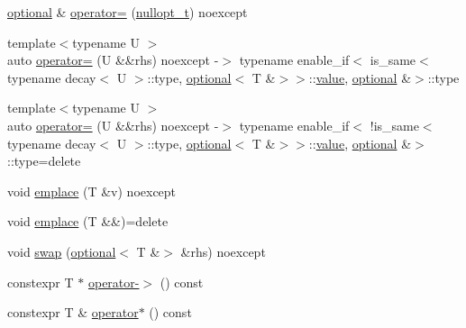 \begin{DoxyCompactItemize}
\item 
\mbox{\hyperlink{classstd_1_1experimental_1_1optional}{optional}} \& \mbox{\hyperlink{classstd_1_1experimental_1_1optional_3_01_t_01_6_01_4_af8f513f05e0710ae389c77721e02c4b8}{operator=}} (\mbox{\hyperlink{structstd_1_1experimental_1_1nullopt__t}{nullopt\+\_\+t}}) noexcept
\item 
{\footnotesize template$<$typename U $>$ }\\auto \mbox{\hyperlink{classstd_1_1experimental_1_1optional_3_01_t_01_6_01_4_a0ccf7e1456d6cdfa46a0a0a6de2f88ba}{operator=}} (U \&\&rhs) noexcept -\/$>$ typename enable\+\_\+if$<$ is\+\_\+same$<$ typename decay$<$ U $>$\+::type, \mbox{\hyperlink{classstd_1_1experimental_1_1optional}{optional}}$<$ T \&$>$$>$\+::\mbox{\hyperlink{classstd_1_1experimental_1_1optional_ad1277f09c288255dfe102b72e7107be6}{value}}, \mbox{\hyperlink{classstd_1_1experimental_1_1optional}{optional}} \&$>$\+::type
\item 
{\footnotesize template$<$typename U $>$ }\\auto \mbox{\hyperlink{classstd_1_1experimental_1_1optional_3_01_t_01_6_01_4_aa0784b03df926b6eb712d1af5d7a7c24}{operator=}} (U \&\&rhs) noexcept -\/$>$ typename enable\+\_\+if$<$ !is\+\_\+same$<$ typename decay$<$ U $>$\+::type, \mbox{\hyperlink{classstd_1_1experimental_1_1optional}{optional}}$<$ T \&$>$$>$\+::\mbox{\hyperlink{classstd_1_1experimental_1_1optional_ad1277f09c288255dfe102b72e7107be6}{value}}, \mbox{\hyperlink{classstd_1_1experimental_1_1optional}{optional}} \&$>$\+::type=delete
\item 
void \mbox{\hyperlink{classstd_1_1experimental_1_1optional_3_01_t_01_6_01_4_a1ab7756f102adebf70ee017f51d74ea2}{emplace}} (T \&v) noexcept
\item 
void \mbox{\hyperlink{classstd_1_1experimental_1_1optional_3_01_t_01_6_01_4_a57289ac8dbe40e7ad6bfacd42b5d9e64}{emplace}} (T \&\&)=delete
\item 
void \mbox{\hyperlink{classstd_1_1experimental_1_1optional_3_01_t_01_6_01_4_aa17c4d91763ef7f26fd8a3a546642f08}{swap}} (\mbox{\hyperlink{classstd_1_1experimental_1_1optional}{optional}}$<$ T \&$>$ \&rhs) noexcept
\item 
constexpr T $\ast$ \mbox{\hyperlink{classstd_1_1experimental_1_1optional_3_01_t_01_6_01_4_af84c2ce49c2b8f8288b9ff92087bd2a5}{operator-\/$>$}} () const
\item 
constexpr T \& \mbox{\hyperlink{classstd_1_1experimental_1_1optional_3_01_t_01_6_01_4_ad9598e2a7490692f6469ee4e42b1da7b}{operator$\ast$}} () const
\item 

\end{DoxyCompactItemize}
